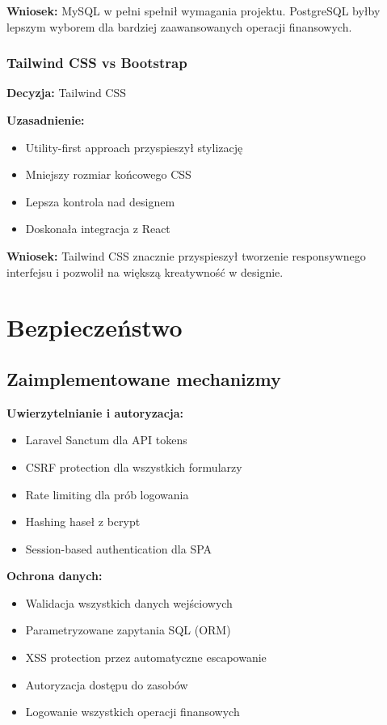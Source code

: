 \documentclass[12pt,a4paper]{article}
\begin{document}
    \textbf{Wniosek:} MySQL w pełni spełnił wymagania projektu. PostgreSQL byłby lepszym wyborem dla bardziej zaawansowanych operacji finansowych.

    \subsubsection{Tailwind CSS vs Bootstrap}

    \textbf{Decyzja:} Tailwind CSS

    \textbf{Uzasadnienie:}
    \begin{itemize}
        \item Utility-first approach przyspieszył stylizację
        \item Mniejszy rozmiar końcowego CSS
        \item Lepsza kontrola nad designem
        \item Doskonała integracja z React
    \end{itemize}

    \textbf{Wniosek:} Tailwind CSS znacznie przyspieszył tworzenie responsywnego interfejsu i pozwolił na większą kreatywność w designie.

    \section{Bezpieczeństwo}

    \subsection{Zaimplementowane mechanizmy}

    \textbf{Uwierzytelnianie i autoryzacja:}
    \begin{itemize}
        \item Laravel Sanctum dla API tokens
        \item CSRF protection dla wszystkich formularzy
        \item Rate limiting dla prób logowania
        \item Hashing haseł z bcrypt
        \item Session-based authentication dla SPA
    \end{itemize}

    \textbf{Ochrona danych:}
    \begin{itemize}
        \item Walidacja wszystkich danych wejściowych
        \item Parametryzowane zapytania SQL (ORM)
        \item XSS protection przez automatyczne escapowanie
        \item Autoryzacja dostępu do zasobów
        \item Logowanie wszystkich operacji finansowych
    \end{itemize}
\end{document}

